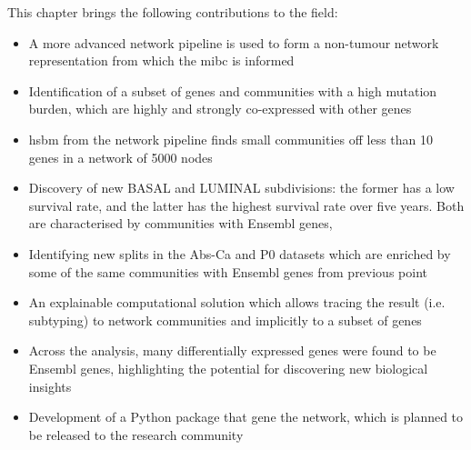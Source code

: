 This chapter brings the following contributions to the field:
\begin{itemize}
    \item A more advanced network pipeline is used to form a non-tumour network representation from which the \acrshort{mibc} is informed
    \item Identification of a subset of genes and communities with a high mutation burden, which are highly and strongly co-expressed with other genes
    \item \acrfull{hsbm} from the network pipeline finds small communities off less than 10 genes in a network of 5000 nodes
    \item Discovery of new \gls{BASAL} and \gls{LUMINAL} subdivisions: the former has a low survival rate, and the latter has the highest survival rate over five years. Both are characterised by communities with Ensembl genes,
    \item Identifying new splits in the Abs-Ca and P0 datasets which are enriched by some of the same communities with Ensembl genes from previous point 
    \item An explainable computational solution which allows tracing the result (i.e. subtyping) to network communities and implicitly to a subset of genes
    \item Across the analysis, many differentially expressed genes were found to be Ensembl genes, highlighting the potential for discovering new biological insights
    \item Development of a Python package that gene the network, which is planned to be released to the research community
\end{itemize}